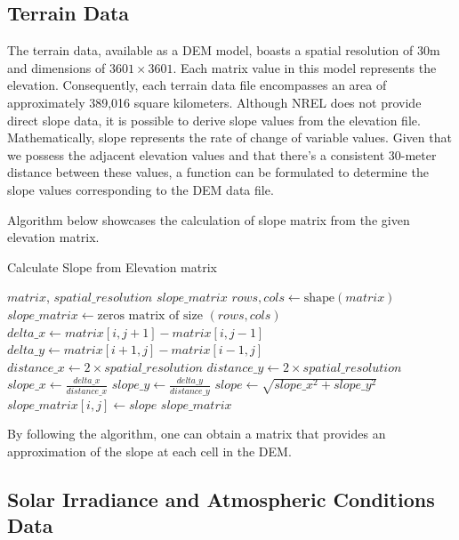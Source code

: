 \documentclass[a4paper,12pt]{Classes/RoboticsLaTeX}
\begin{document}
	\subsection{Terrain Data}
		The terrain data, available as a \ac{DEM} model, boasts a spatial resolution of 30m and dimensions of \(3601 \times 3601\). Each matrix value in this model 
		represents the elevation. Consequently, each terrain data file encompasses an area of approximately 389,016 square kilometers. Although \ac{NREL} does not provide 
		direct slope data, it is possible to derive slope values from the elevation file. Mathematically, slope represents the rate of change of variable values. 
		Given that we possess the adjacent elevation values and that there's a consistent 30-meter distance between these values, a function can be formulated to determine the 
		slope values corresponding to the \ac{DEM} data file.

		Algorithm below showcases the calculation of slope matrix from the given elevation matrix.

		\begin{algorithm}[H]
			\caption{Calculate Slope from Elevation matrix}
			\begin{algorithmic}[1]
			\REQUIRE $matrix$, $spatial\_resolution$
			\ENSURE $slope\_matrix$
			\STATE $rows, cols \leftarrow \text{shape}(matrix)$
			\STATE $slope\_matrix \leftarrow \text{zeros matrix of size } (rows, cols)$
					\STATE $delta\_x \leftarrow matrix[i, j+1] - matrix[i, j-1]$
					\STATE $delta\_y \leftarrow matrix[i+1, j] - matrix[i-1, j]$
					\STATE $distance\_x \leftarrow 2 \times spatial\_resolution$
					\STATE $distance\_y \leftarrow 2 \times spatial\_resolution$
					\STATE $slope\_x \leftarrow \frac{delta\_x}{distance\_x}$
					\STATE $slope\_y \leftarrow \frac{delta\_y}{distance\_y}$
					\STATE $slope \leftarrow \sqrt{slope\_x^2 + slope\_y^2}$
					\STATE $slope\_matrix[i, j] \leftarrow slope$
				\ENDFOR
			\ENDFOR
			\RETURN $slope\_matrix$
			\end{algorithmic}
		\end{algorithm}

		By following the algorithm, one can obtain a matrix that provides an approximation of the slope at each cell in the DEM.

		

	\subsection{Solar Irradiance and Atmospheric Conditions Data}
\end{document}
